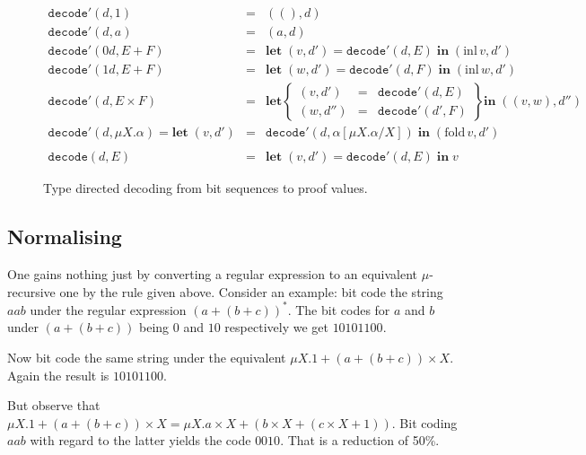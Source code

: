 \documentclass[a4paper, oneside]{memoir}
\theoremstyle{definition}
\begin{document}
\begin{figure}
\[
\begin{array}{lcl}
\mathtt{decode'}(d, 1) & = & ((), d) \\
\mathtt{decode'}(d, a) & = & (a, d) \\
\mathtt{decode'}(0d, E + F) & = & \mathbf{let} \; (v,d') = \mathtt{decode'}(d,E) \; \mathbf{in} \; (\mathrm{inl} \, v, d') \\
\mathtt{decode'}(1d, E + F) & = & \mathbf{let} \; (w,d') = \mathtt{decode'}(d,F) \; \mathbf{in} \; (\mathrm{inl} \, w, d') \\
\mathtt{decode'}(d, E \times F) & = &
    \mathbf{let} \left\{ \begin{array}{rcl} (v,d') &=& \mathtt{decode}'(d, E) \\ (w, d'') &=& \mathtt{decode}'(d', F) \end{array} \right\}
    \mathbf{in} \; ((v,w), d'') \\
\mathtt{decode'}(d, \mu X . \alpha) = \mathbf{let} \; (v,d') & = & \mathtt{decode'}(d, \alpha[\mu X . \alpha / X]) \; \mathbf{in} \; (\mathrm{fold} \, v, d') \\
\\
\mathtt{decode}(d, E) & = & \mathbf{let} \; (v, d') = \mathtt{decode'}(d, E) \; \mathbf{in} \; v
\end{array}
\]
\caption{Type directed decoding from bit sequences to proof values.}
\label{fig:decode}
\end{figure}

\subsection{Normalising}
One gains nothing just by converting a regular expression to an equivalent
$\mu$-recursive one by the rule given above. Consider an example: bit code the
string $aab$ under the regular expression $(a + (b + c))^{\ast}$. The bit codes
for $a$ and $b$ under $(a + (b + c))$ being $0$ and $10$ respectively we get
$10101100$.

Now bit code the same string under the equivalent $\mu X. 1 + (a + (b + c))
\times X$. Again the result is $10101100$.

But observe that $\mu X. 1 + (a + (b + c)) \times X = \mu X. a \times X + (b
\times X + (c \times X + 1))$. Bit coding $aab$ with regard to the latter yields
the code $0010$. That is a reduction of 50\%.
\end{document}
